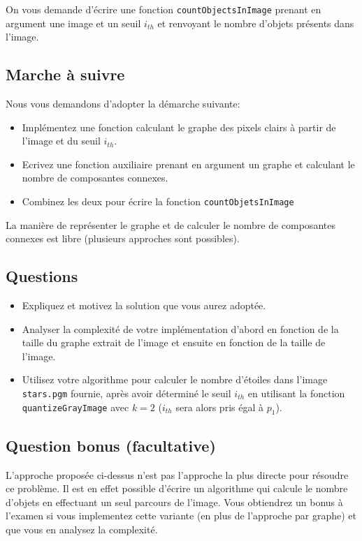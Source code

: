 \documentclass[a4paper,10pt]{article}
\begin{document}
On vous demande d'écrire une fonction \texttt{countObjectsInImage}
prenant en argument une image et un seuil $i_{th}$ et renvoyant le
nombre d'objets présents dans l'image.

\subsection*{Marche à suivre}

Nous vous demandons d'adopter la démarche suivante:
\begin{itemize}
\item Implémentez une fonction calculant le graphe des pixels clairs à partir de l'image et du seuil $i_{th}$.
\item Ecrivez une fonction auxiliaire prenant en argument un graphe et calculant le nombre de composantes connexes.
\item Combinez les deux pour écrire la fonction \texttt{countObjetsInImage}
\end{itemize}
La manière de représenter le graphe et de calculer le nombre de composantes connexes est libre (plusieurs approches sont possibles).

\subsection*{Questions}

\begin{itemize}
\item Expliquez et motivez la solution que vous aurez adoptée.
\item Analyser la complexité de votre implémentation d'abord en fonction de la
  taille du graphe extrait de l'image et ensuite en fonction de la taille de
  l'image.
\item Utilisez votre algorithme pour calculer le nombre d'étoiles dans
  l'image \texttt{stars.pgm} fournie, après avoir déterminé le seuil $i_{th}$ en utilisant la fonction \texttt{quantizeGrayImage} avec $k=2$ ($i_{th}$ sera alors pris égal à $p_1$).
\end{itemize}

\subsection*{Question bonus (facultative)}

L'approche proposée ci-dessus n'est pas l'approche la plus directe
pour résoudre ce problème. Il est en effet possible d'écrire un
algorithme qui calcule le nombre d'objets en effectuant un seul
parcours de l'image. Vous obtiendrez un bonus à l'examen si vous
implementez cette variante (en plus de l'approche par graphe) et que
vous en analysez la complexité.
\end{document}
